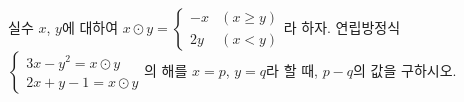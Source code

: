 실수 $x$, $y$에 대하여 $x\odot y=\begin{cases} -x & (x\ge y) \\ 2y & (x<y) \end{cases}$라 하자. 연립방정식 $\begin{cases} 3x-y^2=x\odot y \\ 2x+y-1=x\odot y \end{cases}$의 해를 $x=p$, $y=q$라 할 때, $p-q$의 값을 구하시오.
